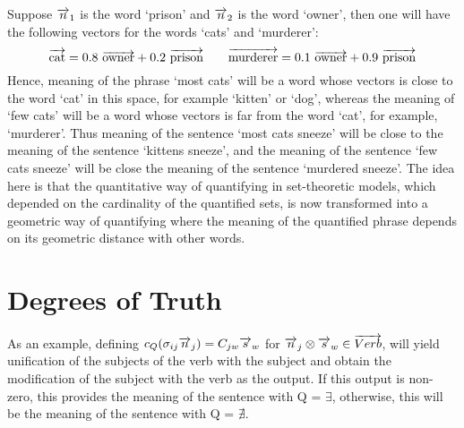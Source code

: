 Suppose $\overrightarrow{n}_1$ is the word  `prison' and $\overrightarrow{n}_2$ is the word `owner', then one will have the following vectors for the words `cats' and `murderer':
\[
\overrightarrow{\text{cat}} = 0.8 \  \overrightarrow{\text{owner}} + 0.2 \ \overrightarrow{\text{prison}}
\qquad
\overrightarrow{\text{murderer}} = 0.1\  \overrightarrow{\text{owner}} + 0.9 \  \overrightarrow{\text{prison}}
\]
Hence,  meaning of the phrase   `most cats' will  be a word whose vectors is close to the word `cat' in this space, for example `kitten' or `dog', whereas the meaning of `few cats' will be a word whose vectors is far from the word `cat', for example, `murderer'. Thus meaning of the sentence `most cats sneeze' will be close to the meaning of the sentence `kittens sneeze', and the meaning of the sentence `few cats sneeze' will be close the meaning of the sentence `murdered sneeze'. The idea here is that the quantitative way of quantifying in set-theoretic models, which depended on the cardinality of the quantified sets, is now transformed into a geometric way of quantifying where the meaning of the quantified phrase depends on its geometric distance with other words. 


\section{Degrees of Truth}

As an example, defining  $c_Q(\sigma_{ij} \overrightarrow{n}_j) =  C_{jw}\overrightarrow{s}_w$ for $\overrightarrow{n}_j \otimes \overrightarrow{s}_w \in \overrightarrow{Verb}$, will yield unification of  the subjects of the verb with the subject and obtain the modification of the subject with the verb as the output. If this output is non-zero, this provides the meaning of the sentence with Q = $\exists$, otherwise, this will be the meaning of the sentence  with Q = $\nexists$. 

